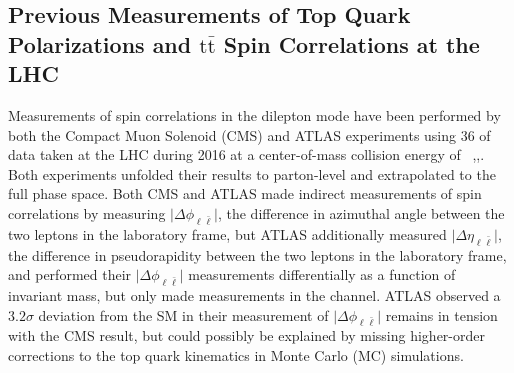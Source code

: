 \begin{refsection}
\section{Previous Measurements of Top Quark Polarizations and \ensuremath{\mathrm{t\bar{t}}} Spin Correlations at the LHC}
Measurements of \ttbar spin correlations in the dilepton mode have been performed by both the Compact Muon Solenoid (CMS) and ATLAS experiments using $36$ \invfb of data taken at the LHC during 2016 at a center-of-mass collision energy of \beamenergy~\cite{arxiv.1905.08634},\cite{Sirunyan:2681777},\cite{Aaboud:2667501}.
Both experiments unfolded their results to parton-level and extrapolated to the full phase space.
Both CMS and ATLAS made indirect measurements of \ttbar spin correlations by measuring $\vert \Delta\phi_{\ell\bar{\ell}} \vert$, the difference in azimuthal angle between the two leptons in the laboratory frame, but ATLAS additionally measured $\vert \Delta\eta_{\ell\bar{\ell}} \vert$, the difference in pseudorapidity between the two leptons in the laboratory frame, and performed their $\vert \Delta\phi_{\ell\bar{\ell}} \vert$ measurements differentially as a function of \ttbar invariant mass, but only made measurements in the \emu channel.
ATLAS observed a $3.2 \sigma$ deviation from the SM in their measurement of $\vert \Delta\phi_{\ell\bar{\ell}} \vert$ remains in tension with the CMS result, but could possibly be explained by missing higher-order corrections to the top quark kinematics in Monte Carlo (MC) simulations.




\clearpage
\printbibliography[heading=subbibliography,resetnumbers=true]
\end{refsection}
